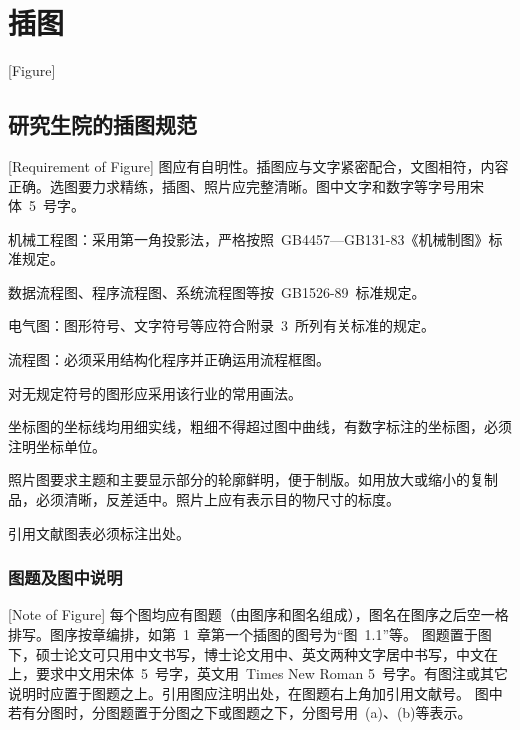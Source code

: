 
%
%
%

\chapter{插图}[Figure]
\label{chap05}

\section{研究生院的插图规范}[Requirement of Figure]
图应有自明性。插图应与文字紧密配合，文图相符，内容正确。选图要力求精练，插图、照片应完整清晰。图中文字和数字等字号用宋体~5~号字。

机械工程图：采用第一角投影法，严格按照~GB4457---GB131-83《机械制图》标准规定。

数据流程图、程序流程图、系统流程图等按~GB1526-89~标准规定。

电气图：图形符号、文字符号等应符合附录~3~所列有关标准的规定。

流程图：必须采用结构化程序并正确运用流程框图。

对无规定符号的图形应采用该行业的常用画法。

坐标图的坐标线均用细实线，粗细不得超过图中曲线，有数字标注的坐标图，必须注明坐标单位。

照片图要求主题和主要显示部分的轮廓鲜明，便于制版。如用放大或缩小的复制品，必须清晰，反差适中。照片上应有表示目的物尺寸的标度。

引用文献图表必须标注出处。


\subsection{图题及图中说明}[Note of Figure]
每个图均应有图题（由图序和图名组成），图名在图序之后空一格排写。图序按章编排，如第~1~章第一个插图的图号为“图~1.1”等。
图题置于图下，硕士论文可只用中文书写，博士论文用中、英文两种文字居中书写，中文在上，要求中文用宋体~5~号字，英文用~Times New Roman 5~号字。有图注或其它说明时应置于图题之上。引用图应注明出处，在图题右上角加引用文献号。
图中若有分图时，分图题置于分图之下或图题之下，分图号用~(a)、(b)等表示。

